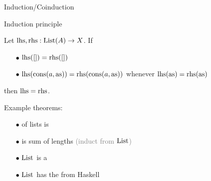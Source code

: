 \begin{frame}{Induction/Coinduction} %

  \begin{block}{Induction principle}
    
    \par Let $\mathrm{lhs}, \mathrm{rhs} : \operatorname{List}(A) \to X$. If
    \begin{itemize}
      \item[$\bullet$] {
        $\mathrm{lhs}([]) = \mathrm{rhs}([])$
      }
      \item[$\bullet$] {
        $\mathrm{lhs}(\operatorname{cons}(a, \mathrm{as})) = \mathrm{rhs}(\operatorname{cons}(a, \mathrm{as}))$ whenever $\mathrm{lhs}(\mathrm{as}) = \mathrm{rhs}(\mathrm{as})$
      }
    \end{itemize}
    then $\mathrm{lhs} = \mathrm{rhs}$.

  \end{block}

  \pause

  \par Example theorems:
  \begin{itemize}
    \item[$\bullet$] {
       of lists is 
    }
    \item[$\bullet$] {
       is sum of lengths \textcolor{gray}{(induct from $\operatorname{List}$)}
    }
    \item[$\bullet$] {
      $\operatorname{List}$ is a 
    }
    \item[$\bullet$] {
      $\operatorname{List}$ has the  from Haskell
    }
  \end{itemize}
  
\end{frame}

